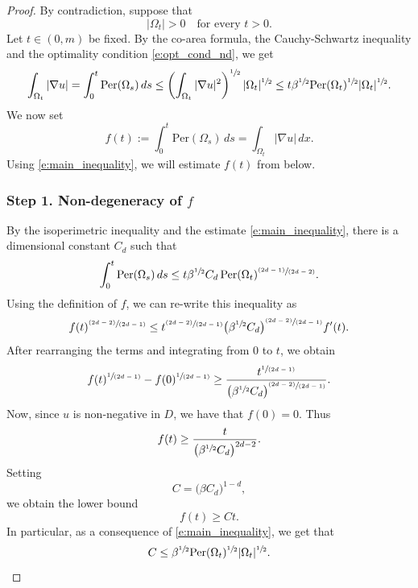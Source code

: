 \documentclass[11pt]{article}
\numberwithin{equation}{section}
\newcommand{\pspfrac}[2]{\sfrac{(#1)}{(#2)}}
\newcommand{\spfrac}[2]{\sfrac{#1}{(#2)}}
\newcommand{\Per}{\mathrm{Per}}
\theoremstyle{plain}
\theoremstyle{definition}
\begin{document}
\begin{proof}
By contradiction, suppose that
\[|\Omega_t|>0\quad\text{for every } t>0.\]
Let $t\in(0,m)$ be fixed. By the co-area formula, the Cauchy-Schwartz inequality and the optimality condition \eqref{e:opt_cond_nd}, we get
\begin{equation}\label{e:main_inequality}
\int_{\Omega_t}|\nabla u|=\int_0^t\Per(\Omega_s)\,ds\le \left(\int_{\Omega_t}|\nabla u|^2\right)^{\sfrac12}|\Omega_t|^{\sfrac12}\le t\beta^{\sfrac12}\Per(\Omega_t)^{\sfrac12}|\Omega_t|^{\sfrac12}.
\end{equation}
We now set
\[f(t):=\int_{0}^t \Per(\Omega_s)\,ds=\int_{\Omega_t}|\nabla u|\,dx.\]
Using \eqref{e:main_inequality}, we will estimate $f(t)$ from below.

\subsubsection*{Step 1. Non-degeneracy of $f$}
By the isoperimetric inequality and the estimate \eqref{e:main_inequality}, there is a dimensional constant $C_d$ such that
\[\int_{0}^t \Per(\Omega_s)\,ds\le t\beta^{\sfrac12}C_d\,\Per(\Omega_t)^{\pspfrac{2d-1}{2d-2}}.\]
Using the definition of $f$, we can re-write this inequality as
\[f(t)^{\pspfrac{2d-2}{2d-1}}\le t^{\pspfrac{2d-2}{2d-1}}\big(\beta^{\sfrac12}C_d\big)^{\pspfrac{2d-2}{2d-1}}f'(t).\]
After rearranging the terms and integrating from $0$ to $t$, we obtain
\[f(t)^{\spfrac1{2d-1}}-f(0)^{\spfrac1{2d-1}}\ge \frac{t^{\spfrac1{2d-1}}}{\big(\beta^{\sfrac12}C_d\big)^{\pspfrac{2d-2}{2d-1}}}.\]
Now, since $u$ is non-negative in $D$, we have that $f(0)=0$. Thus
\[f(t)\ge \frac{t}{\big(\beta^{\sfrac12}C_d\big)^{{2d-2}}}.\]
Setting
\begin{equation}\label{e:def_C}
C=\big(\beta C_d\big)^{1-d},
\end{equation}
we obtain the lower bound
\[f(t)\ge Ct.\]
In particular, as a consequence of \eqref{e:main_inequality}, we get that
\begin{equation}\label{e:induction0}
C\le \beta^{\sfrac12} \Per(\Omega_t)^{\sfrac12}|\Omega_t|^{\sfrac12}.
\end{equation}


\end{proof}
\end{document}
